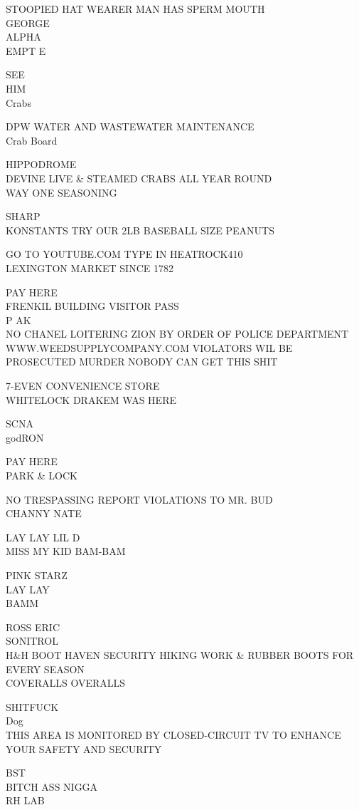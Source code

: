 \documentclass[10pt,letterpaper]{article}
\begin{document}
STOOPIED HAT WEARER MAN HAS SPERM MOUTH\\
GEORGE\\
ALPHA\\
EMPT E

SEE\\
HIM\\
Crabs

DPW WATER AND WASTEWATER MAINTENANCE\\
Crab Board

HIPPODROME\\
DEVINE LIVE \& STEAMED CRABS ALL YEAR ROUND\\
WAY ONE SEASONING

SHARP\\
KONSTANTS TRY OUR 2LB BASEBALL SIZE PEANUTS

GO TO YOUTUBE.COM TYPE IN HEATROCK410\\
LEXINGTON MARKET SINCE 1782

PAY HERE\\
FRENKIL BUILDING VISITOR PASS\\
P AK\\
NO CHANEL LOITERING ZION BY ORDER OF POLICE DEPARTMENT WWW.WEEDSUPPLYCOMPANY.COM VIOLATORS WIL BE PROSECUTED MURDER NOBODY CAN GET THIS SHIT

7{-}EVEN CONVENIENCE STORE\\
WHITELOCK DRAKEM WAS HERE

SCNA\\
godRON

PAY HERE\\
PARK \& LOCK

NO TRESPASSING REPORT VIOLATIONS TO MR. BUD\\
CHANNY NATE

LAY LAY LIL D\\
MISS MY KID BAM{-}BAM

PINK STARZ\\
LAY LAY\\
BAMM

ROSS ERIC\\
SONITROL\\
H\&H BOOT HAVEN SECURITY HIKING WORK \& RUBBER BOOTS FOR EVERY SEASON\\
COVERALLS OVERALLS

SHITFUCK\\
Dog\\
THIS AREA IS MONITORED BY CLOSED{-}CIRCUIT TV TO ENHANCE YOUR SAFETY AND SECURITY

BST\\
BITCH ASS NIGGA\\
RH LAB
\end{document}
